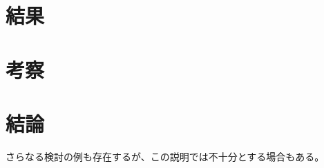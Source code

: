 \documentclass[11pt,dvipdfmx,a4paper]{jsarticle}
\begin{document}
\section{結果}

\section{考察}

\section{結論}


さらなる検討の例\cite{huga}も存在するが、この説明では不十分とする場合もある\cite{hoge}。



\end{document}
